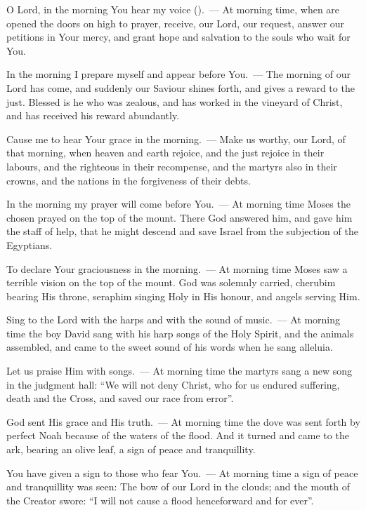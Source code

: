 \documentclass[12pt,twoside,a5paper]{article}
\begin{document}
\begin{halfparskip}
  O Lord, in the morning You hear my voice ().~--- At morning time, when are opened the doors on high to prayer, receive, our Lord, our request, answer our petitions in Your mercy, and grant hope and salvation to the souls who wait for You.

  In the morning I prepare myself and appear before You.~--- The morning of our Lord has come, and suddenly our Saviour shines forth, and gives a reward to the just. Blessed is he who was zealous, and has worked in the vineyard of Christ, and has received his reward abundantly.

  Cause me to hear Your grace in the morning.~--- Make us worthy, our Lord, of that morning, when heaven and earth rejoice, and the just rejoice in their labours, and the righteous in their recompense, and the martyrs also in their crowns, and the nations in the forgiveness of their debts.

  In the morning my prayer will come before You.~--- At morning time Moses the chosen prayed on the top of the mount. There God answered him, and gave him the staff of help, that he might descend and save Israel from the subjection of the Egyptians.

  To declare Your graciousness in the morning.~--- At morning time Moses saw a terrible vision on the top of the mount. God was solemnly carried, cherubim bearing His throne, seraphim singing Holy in His honour, and angels serving Him.

  Sing to the Lord with the harps and with the sound of music.~--- At morning time the boy David sang with his harp songs of the Holy Spirit, and the animals assembled, and came to the sweet sound of his words when he sang alleluia.

  Let us praise Him with songs.~--- At morning time the martyrs sang a new song in the judgment hall: ``We will not deny Christ, who for us endured suffering, death and the Cross, and saved our race from error''.

  God sent His grace and His truth.~--- At morning time the dove was sent forth by perfect Noah because of the waters of the flood. And it turned and came to the ark, bearing an olive leaf, a sign of peace and tranquillity.

  You have given a sign to those who fear You.~--- At morning time a sign of peace and tranquillity was seen: The bow of our Lord in the clouds; and the mouth of the Creator swore: ``I will not cause a flood henceforward and for ever''.


\end{halfparskip}
\end{document}

